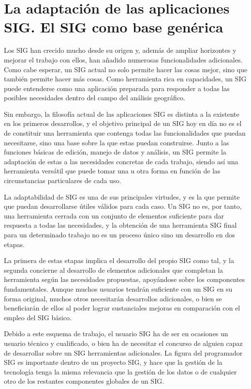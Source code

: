 \section{La adaptación de las aplicaciones SIG. El SIG como base genérica}
	
Los SIG han crecido mucho desde su origen y, además de ampliar horizontes y mejorar el trabajo con ellos, han añadido numerosas funcionalidades adicionales. Como cabe esperar, un SIG actual no solo permite hacer las cosas mejor, sino que también permite hacer más cosas. Como herramienta rica en capacidades, un SIG puede entenderse como una aplicación preparada para responder a todas las posibles necesidades dentro del campo del análisis geográfico.

Sin embargo, la filosofía actual de las aplicaciones SIG es distinta a la existente en los primeros desarrollos, y el objetivo principal de un SIG hoy en día no es el de constituir una herramienta que contenga todas las funcionalidades que puedan necesitarse, sino una base sobre la que estas puedan construirse. Junto a las funciones básicas de edición, manejo de datos y análisis, un SIG permite la adaptación de estas a las necesidades concretas de cada trabajo, siendo así una herramienta versátil que puede tomar una u otra forma en función de las circunstancias particulares de cada uso.

La adaptabilidad de SIG es una de sus principales virtudes, y es la que permite que puedan desarrollarse útiles válidos para cada caso. Un SIG no es, por tanto, una herramienta cerrada con un conjunto de elementos suficiente para dar respuesta a todas las necesidades, y la obtención de una herramienta SIG final para un determinado trabajo no es un proceso único sino un desarrollo en dos etapas. 

La primera de estas etapas implica el desarrollo del propio SIG como tal, y la segunda concierne al desarrollo de elementos adicionales que completan la herramienta según las necesidades propuestas, apoyándose sobre los componentes fundamentales. Aunque muchos usuarios tendrán suficiente con un SIG en su forma original, muchos otros necesitarán desarrollos adicionales, o bien se beneficiarán de ellos al poder lograr sustanciales mejoras en comparación con el empleo del SIG básico.

Debido a este esquema de trabajo, el usuario SIG ha de ser en ocasiones un usuario técnico y cualificado, o bien ha de necesitar el concurso de alguien capaz de desarrollar sobre un SIG herramientas adicionales. La figura del programador SIG es importante dentro de un proyecto SIG, y hace que la gestión de la tecnología tenga la misma relevancia que la gestión de los datos o de cualquier otro de los restantes componentes globales de un SIG.

